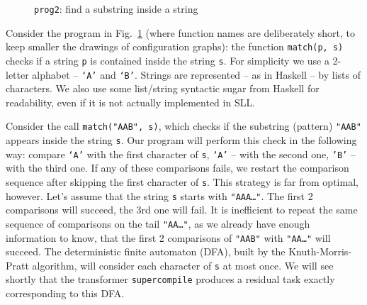 \begin{figure}[t!]
\caption{\texttt{prog2}: find a substring inside a string}
\label{fig:prog2}

\end{figure}

Consider the program in Fig.~\ref{fig:prog2}
(where function names are deliberately short, to keep smaller the drawings of configuration
graphs):
the function \texttt{match(p, s)} checks if a string \texttt{p}
is contained inside the string \texttt{s}.
For simplicity we use a 2-letter alphabet -- \texttt{`A'} and \texttt{`B'}. 
Strings are represented -- as in Haskell -- by lists of characters.
We also use some list/string syntactic sugar from
Haskell for readability, even if it is not actually implemented in SLL.

Consider the call \texttt{match("AAB", s)}, 
which checks if the substring (pattern) \texttt{"AAB"} appears inside the string \texttt{s}.
Our program will perform this check in the following way: compare \texttt{`A'}
with the first character of \texttt{s}, \texttt{`A'} -- with the second one,
\texttt{'B'} -- with the third one.
If any of these comparisons fails, we restart the comparison sequence
after skipping the first character of \texttt{s}.
This strategy is far from optimal, however.
Let's assume that the string \texttt{s} starts with \texttt{"AAA\ldots"}.
The first 2 comparisons will succeed, the 3rd one will fail.
It is inefficient to repeat the same sequence of comparisons
on the tail \texttt{"AA\ldots"},
as we already have enough information to know, that the first 2 comparisons of \texttt{"AAB"}
with \texttt{"AA\ldots"} will succeed. 
The deterministic finite automaton (DFA), built by the Knuth-Morris-Pratt algorithm,
will consider each character of \texttt{s} at most once.
We will see shortly that the transformer \texttt{supercompile} produces
a residual task exactly corresponding to this DFA.

